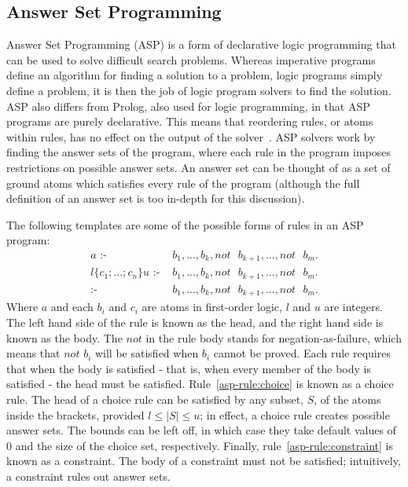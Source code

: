 \documentclass[../interim.tex]{subfiles}
\begin{document}
\subsection{Answer Set Programming}

Answer Set Programming (ASP) is a form of declarative logic programming that can be used to solve difficult search problems. Whereas imperative programs define an algorithm for finding a solution to a problem, logic programs simply define a problem, it is then the job of logic program solvers to find the solution. ASP also differs from Prolog, also used for logic programming, in that ASP programs are purely declarative. This means that reordering rules, or atoms within rules, has no effect on the output of the solver~\cite{asp-primer}. ASP solvers work by finding the answer sets of the program, where each rule in the program imposes restrictions on possible answer sets. An answer set can be thought of as a set of ground atoms which satisfies every rule of the program (although the full definition of an answer set is too in-depth for this discussion).

The following templates are some of the possible forms of rules in an ASP program:
\begin{align}
  a \text{ :- }& b_1, ..., b_k, not \text{ } b_{k+1}, ..., not \text{ } b_m. \label{asp-rule:normal}\\
  l \{c_1;...;c_n\} u \text{ :- }& b_1,...,b_k, not \text{ } b_{k+1}, ..., not \text{ } b_m. \label{asp-rule:choice}\\
  \text{:- }& b_1,...,b_k, not \text{ } b_{k+1}, ..., not \text{ } b_m. \label{asp-rule:constraint}
\end{align}
\noindent
{\footnotesize Where $a$ and each $b_i$ and $c_i$ are atoms in first-order logic, $l$ and $u$ are integers.} \\

The left hand side of the rule is known as the head, and the right hand side is known as the body. The $not$ in the rule body stands for negation-as-failure, which means that $not$ $b_i$ will be satisfied when $b_i$ cannot be proved. Each rule requires that when the body is satisfied - that is, when every member of the body is satisfied - the head must be satisfied. Rule~\ref{asp-rule:choice} is known as a choice rule. The head of a choice rule can be satisfied by any subset, $S$, of the atoms inside the brackets, provided $l \leq |S| \leq u$; in effect, a choice rule creates possible answer sets. The bounds can be left off, in which case they take default values of $0$ and the size of the choice set, respectively. Finally, rule~\ref{asp-rule:constraint} is known as a constraint. The body of a constraint must not be satisfied; intuitively, a constraint rules out answer sets.
\end{document}
